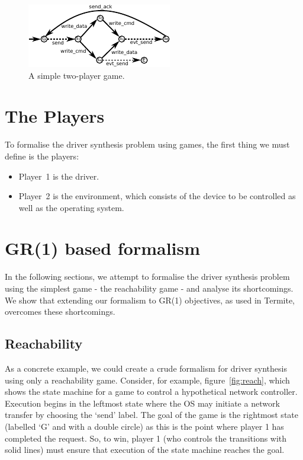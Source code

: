 \begin{figure}[t]
    \center
    \includegraphics[width=0.7\linewidth]{imgs/game.pdf}
    \caption{A simple two-player game.}
    \label{f:game}
\end{figure}

\section{The Players}

To formalise the driver synthesis problem using games, the first thing we must define is the players:

\begin{itemize}
    \item Player~1 is the driver. 
    \item Player~2 is the environment, which consists of the device to be controlled as well as the operating system.
\end{itemize}

\section{GR(1) based formalism}

In the following sections, we attempt to formalise the driver synthesis problem using the simplest game - the reachability game - and analyse its shortcomings. We show that extending our formalism to GR(1) objectives, as used in Termite, overcomes these shortcomings.

\subsection{Reachability}

As a concrete example, we could create a crude formalism for driver synthesis using only a reachability game. Consider, for example, figure~\ref{fig:reach}, which shows the state machine for a game to control a hypothetical network controller. Execution begins in the leftmost state where the OS may initiate a network transfer by choosing the `send' label. The goal of the game is the rightmost state (labelled `G' and with a double circle) as this is the point where player 1 has completed the request. So, to win, player 1 (who controls the transitions with solid lines) must ensure that execution of the state machine reaches the goal. 

